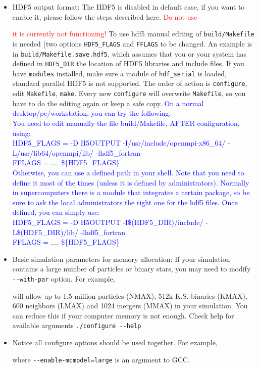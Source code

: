 \begin{itemize}
    \item HDF5 output format: The HDF5 is disabled in default case, if you want to enable it, please follow the steps described here.  \textcolor{red}{Do not use }
    
    \textcolor{red}{}

    \textcolor{red}{it is currently not functioning!} To use hdf5 manual editing of {\tt build/Makefile} is needed (two options {\tt HDF5\_FLAGS} and {\tt FFLAGS} to be changed. An example is in {\tt build/Makefile.save.hdf5}, which assumes that you or your system has defined in {\tt HDF5\_DIR} the location of HDF5 libraries and include files. If you have {\tt modules} installed, make sure a module of {\tt hdf\_serial} is  loaded, standard parallel HDF5 is not supported. The order of action is {\tt configure}, edit {\tt Makefile}, {\tt make}. Every new {\tt configure} will overwrite {\tt Makefile}, so you have to do the editing again or keep a safe copy.
    \textcolor{blue}{On a normal desktop/pc/workstation, you can try the following:\\
    You need to edit manually the file build/Makefile, AFTER configuration, using:\\
HDF5\_FLAGS = -D H5OUTPUT -I/usr/include/openmpi-x86\_64/ -L/usr/lib64/openmpi/lib/ -lhdf5\_fortran \\
FFLAGS = .... \$\{HDF5\_FLAGS\}\\
Otherwise, you can use a defined path in your shell. Note that you need to define it most of the times (unless it is defined by administrators). Normally in supercomputers there is a module that integrates a certain package, so be sure to ask the local administrators the right one for the hdf5 files. Once defined, you can simply use:\\
HDF5\_FLAGS = -D H5OUTPUT -I\$(HDF5\_DIR)/include/ -L\$(HDF5\_DIR)/lib/ -lhdf5\_fortran\\
FFLAGS = .... \$\{HDF5\_FLAGS\}}

    \item Basic simulation parameters for memory allocation: If your simulation contains a large number of particles or binary stars, you may need to modify {\tt -{}-with-par} option. For example, 
    

    will allow up to 1.5 million particles (NMAX), 512k K.S. binaries (KMAX), 600 neighbors (LMAX) and 1024 mergers (MMAX) in your simulation. You can reduce this if your computer memory is not enough. Check help for available arguments {\tt ./configure -{}-help}

    \item Notice all configure options should be used together. For example, 
    
    
    where {\tt-{}-enable-mcmodel=large} is an argument to GCC. 
\end{itemize}

